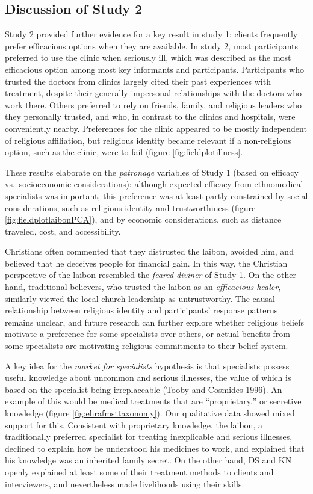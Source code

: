 \documentclass[
  11pt,
]{article}
\begin{document}
\hypertarget{discussion-of-study-2}{%
\subsection{Discussion of Study 2}\label{discussion-of-study-2}}

Study 2 provided further evidence for a key result in study 1: clients frequently prefer efficacious options when they are available. In study 2, most participants preferred to use the clinic when seriously ill, which was described as the most efficacious option among most key informants and participants. Participants who trusted the doctors from clinics largely cited their past experiences with treatment, despite their generally impersonal relationships with the doctors who work there. Others preferred to rely on friends, family, and religious leaders who they personally trusted, and who, in contrast to the clinics and hospitals, were conveniently nearby. Preferences for the clinic appeared to be mostly independent of religious affiliation, but religious identity became relevant if a non-religious option, such as the clinic, were to fail (figure \ref{fig:fieldplotillness}.

These results elaborate on the \emph{patronage} variables of Study 1 (based on efficacy vs.~socioeconomic considerations): although expected efficacy from ethnomedical specialists was important, this preference was at least partly constrained by social considerations, such as religious identity and trustworthiness (figure \ref{fig:fieldplotlaibonPCA}), and by economic considerations, such as distance traveled, cost, and accessibility.

Christians often commented that they distrusted the laibon, avoided him, and believed that he deceives people for financial gain. In this way, the Christian perspective of the laibon resembled the \emph{feared diviner} of Study 1. On the other hand, traditional believers, who trusted the laibon as an \emph{efficacious healer}, similarly viewed the local church leadership as untrustworthy. The causal relationship between religious identity and participants' response patterns remains unclear, and future research can further explore whether religious beliefs motivate a preference for some specialists over others, or actual benefits from some specialists are motivating religious commitments to their belief system.

A key idea for the \emph{market for specialists} hypothesis is that specialists possess useful knowledge about uncommon and serious illnesses, the value of which is based on the specialist being irreplaceable (Tooby and Cosmides 1996). An example of this would be medical treatments that are ``proprietary,'' or secretive knowledge (figure \ref{fig:ehrafmsttaxonomy}). Our qualitative data showed mixed support for this. Consistent with proprietary knowledge, the laibon, a traditionally preferred specialist for treating inexplicable and serious illnesses, declined to explain how he understood his medicines to work, and explained that his knowledge was an inherited family secret. On the other hand, DS and KN openly explained at least some of their treatment methods to clients and interviewers, and nevertheless made livelihoods using their skills.
\end{document}
